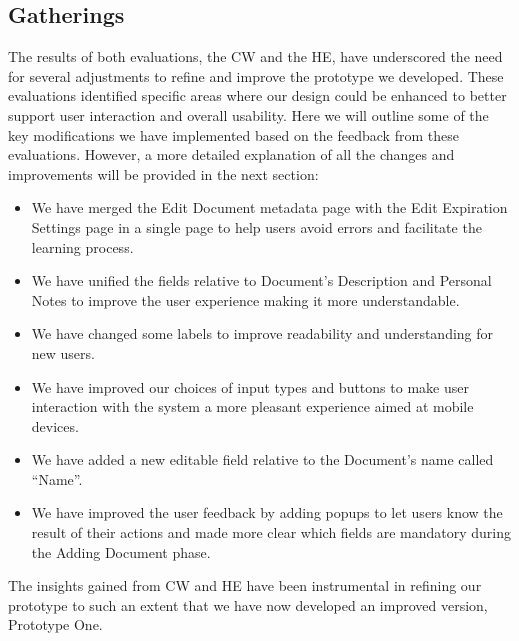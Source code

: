 \subsection{Gatherings}
The results of both evaluations, the CW and the HE, have underscored the need for several adjustments to refine and improve the prototype we developed. These evaluations identified specific areas where our design could be enhanced to better support user interaction and overall usability.\newline\newline
Here we will outline some of the key modifications we have implemented based on the feedback from these evaluations. However, a more detailed explanation of all the changes and improvements will be provided in the next section: 
\begin{itemize}
	\item We have merged the Edit Document metadata page with the Edit Expiration Settings page in a single page to help users avoid errors and facilitate the learning process.
	\item We have unified the fields relative to Document’s Description and Personal Notes to improve the user experience making it more understandable.
	\item We have changed some labels to improve readability and understanding for new users.
	\item We have improved our choices of input types and buttons to make user interaction with the system a more pleasant experience aimed at mobile devices.
	\item We have added a new editable field relative to the Document’s name called “Name”.
	\item We have improved the user feedback by  adding popups to let users know the result of their actions and made more clear which fields are mandatory during the Adding Document phase. 
	
\end{itemize}
The insights gained from CW and HE have been instrumental in refining our prototype to such an extent that we have now developed an improved version, Prototype One.